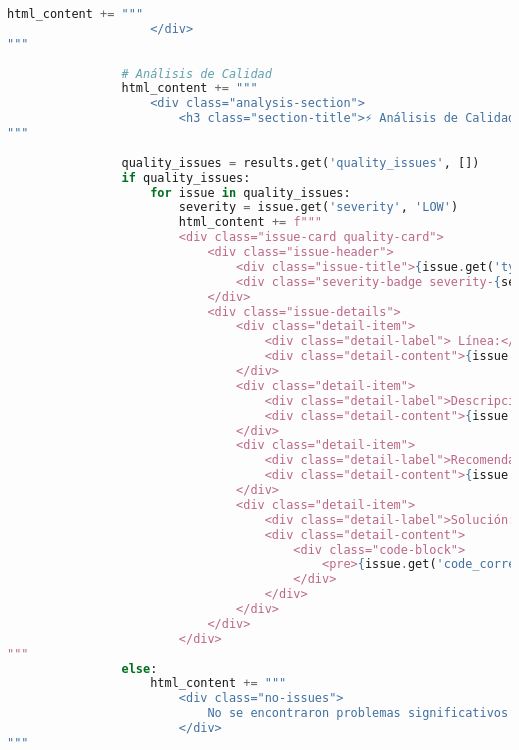 \begin{lstlisting}[language=python, caption={Contenido completo del script ai\_analyzer.py.}, label={lst:python_script}]
                html_content += """
                    </div>
"""
                
                # Análisis de Calidad
                html_content += """
                    <div class="analysis-section">
                        <h3 class="section-title">⚡ Análisis de Calidad</h3>
"""
                
                quality_issues = results.get('quality_issues', [])
                if quality_issues:
                    for issue in quality_issues:
                        severity = issue.get('severity', 'LOW')
                        html_content += f"""
                        <div class="issue-card quality-card">
                            <div class="issue-header">
                                <div class="issue-title">{issue.get('type', 'Unknown Issue')}</div>
                                <div class="severity-badge severity-{severity.lower()}-bg">{severity}</div>
                            </div>
                            <div class="issue-details">
                                <div class="detail-item">
                                    <div class="detail-label"> Línea:</div>
                                    <div class="detail-content">{issue.get('line', 'N/A')}</div>
                                </div>
                                <div class="detail-item">
                                    <div class="detail-label">Descripción:</div>
                                    <div class="detail-content">{issue.get('description', 'N/A')}</div>
                                </div>
                                <div class="detail-item">
                                    <div class="detail-label">Recomendación:</div>
                                    <div class="detail-content">{issue.get('recommendation', 'N/A')}</div>
                                </div>
                                <div class="detail-item">
                                    <div class="detail-label">Solución:</div>
                                    <div class="detail-content">
                                        <div class="code-block">
                                            <pre>{issue.get('code_correction_suggested', 'N/A')}</pre>
                                        </div>
                                    </div>
                                </div>
                            </div>
                        </div>
"""
                else:
                    html_content += """
                        <div class="no-issues">
                            No se encontraron problemas significativos de calidad
                        </div>
"""
                

\end{lstlisting}
